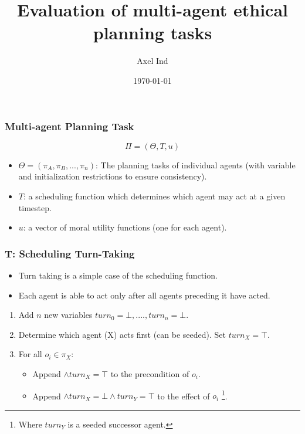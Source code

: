 \documentclass{beamer}
\title{Evaluation of multi-agent ethical planning tasks}
\author{Axel Ind}
\institute{Uni-Freiburg}
\date{\today}
\begin{document}
\frame{\titlepage}

\begin{frame}
\frametitle{Multi-agent Planning Task}
\begin{equation}
\Pi = \left( \Theta, T, u \right)
\end{equation}

\begin{itemize}
\item $\Theta=\left( \pi_A, \pi_B, ... , \pi_n \right)$: The planning tasks of individual agents (with variable and initialization restrictions to ensure consistency).
\item $T$: a scheduling function which determines which agent may act at a given timestep.
\item $u$: a vector of moral utility functions (one for each agent).
\end{itemize}
\end{frame}

 
\begin{frame}
\frametitle{T: Scheduling Turn-Taking}
\begin{itemize}
\item Turn taking is a simple case of the scheduling function.
\item Each agent is able to act only after all agents preceding it have acted.
\end{itemize}

\begin{enumerate}

\item Add $n$ new variables $turn_0=\bot, ...., turn_n=\bot$.
\item Determine which agent (X) acts first (can be seeded). Set $turn_X=\top$.
\item For all $o_i \in \pi_X$:
\begin{itemize}
\item Append $\land turn_X = \top$ to the precondition of $o_i$.
\item Append $\land turn_X = \bot \land turn_Y = \top$ to the effect of $o_i$ \footnote{Where $turn_Y$ is a seeded successor agent.}.
\end{itemize}
\end{enumerate}

\end{frame} 
\end{document}
